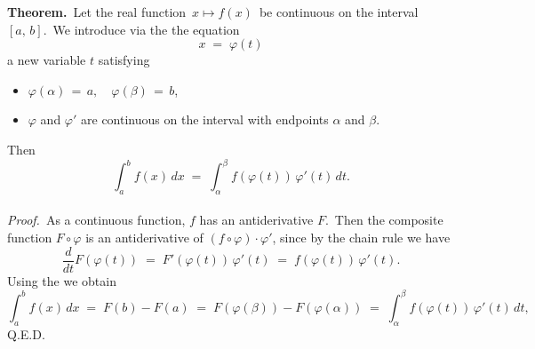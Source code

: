 \documentclass[12pt]{article}
\theoremstyle{definition}
\begin{document}
\textbf{Theorem.}\, Let the real function \,$x \mapsto f(x)$\, be continuous on the interval \,$[a,\,b]$.\, We introduce via the the equation
$$x \;=\; \varphi(t)$$
a new variable $t$ satisfying
\begin{itemize}
\item $\varphi(\alpha) \,=\, a, \quad \varphi(\beta) \,=\, b$,
\item $\varphi$ and $\varphi'$ are continuous on the interval with endpoints $\alpha$ and $\beta$.
\end{itemize}
Then
$$\int_a^b\!f(x)\,dx \;=\; \int_\alpha^\beta\!f(\varphi(t))\,\varphi'(t)\,dt.$$\\


{\em Proof.}\, As a continuous function, $f$ has an antiderivative $F$.\, Then the composite function $F\circ\varphi$ is an antiderivative of $(f\circ\varphi)\cdot\varphi'$, since by the chain rule we have
$$\frac{d}{dt}F(\varphi(t)) \;=\; F'(\varphi(t))\,\varphi'(t) \;=\; f(\varphi(t))\,\varphi'(t).$$
Using the  we obtain
$$\int_a^b\!f(x)\,dx \;=\; F(b)-F(a) \;=\; F(\varphi(\beta))-F(\varphi(\alpha)) 
\;=\; \int_\alpha^\beta\!f(\varphi(t))\,\varphi'(t)\,dt,$$
Q.E.D.
\end{document}
